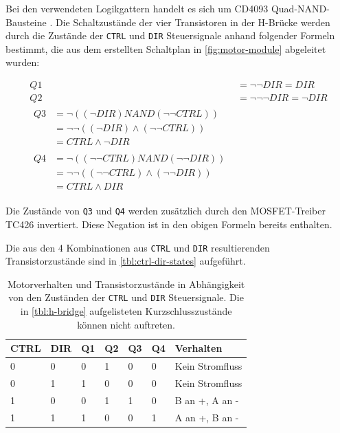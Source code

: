 \documentclass[german]{thesis_KBS}
\newcommand{\code}[1]{\texttt{#1}}  %
\begin{document}
Bei den verwendeten Logikgattern handelt es sich um CD4093 Quad-NAND-Bausteine
\cite{nand-datasheet}. Die Schaltzustände der vier Transistoren in der H-Brücke
werden durch die Zustände der \code{CTRL} und \code{DIR} Steuersignale anhand
folgender Formeln bestimmt, die aus dem erstellten Schaltplan in
\autoref{fig:motor-module} abgeleitet wurden:

\begin{align}
    Q1 &= \neg \neg \mathit{DIR} = \mathit{DIR} \\
    Q2 &= \neg \neg \neg \mathit{DIR} = \neg \mathit{DIR} \\
\begin{split}
    Q3 &= \neg ((\neg \mathit{DIR}) \mathit{NAND} (\neg \neg \mathit{CTRL})) \\
       &= \neg \neg ((\neg \mathit{DIR}) \wedge (\neg \neg \mathit{CTRL})) \\
       &= \mathit{CTRL} \wedge \neg \mathit{DIR}
\end{split} \\
\begin{split}
    Q4 &= \neg ((\neg \neg \mathit{CTRL}) \mathit{NAND} (\neg \neg \mathit{DIR})) \\
       &= \neg \neg ((\neg \neg \mathit{CTRL}) \wedge (\neg \neg \mathit{DIR})) \\
       &= \mathit{CTRL} \wedge \mathit{DIR}
\end{split}
\end{align}

Die Zustände von \code{Q3} und \code{Q4} werden zusätzlich durch den
MOSFET-Treiber TC426 invertiert. Diese Negation ist in den obigen Formeln
bereits enthalten.

Die aus den 4 Kombinationen aus \code{CTRL} und \code{DIR} resultierenden
Transistorzustände sind in \autoref{tbl:ctrl-dir-states} aufgeführt.

\begin{table}
    \centering
    \begin{tabular}{|l|l|l|l|l|l|l|}
        CTRL & DIR & Q1  & Q2  & Q3  & Q4  & Verhalten       \\ \hline
        0    & 0    & 0   & 1   & 0   & 0   & Kein Stromfluss \\
        0    & 1    & 1   & 0   & 0   & 0   & Kein Stromfluss \\
        1    & 0    & 0   & 1   & 1   & 0   & B an +, A an -  \\
        1    & 1    & 1   & 0   & 0   & 1   & A an +, B an -  \\
    \end{tabular}
    \caption{
        Motorverhalten und Transistorzustände in Abhängigkeit von den
        Zuständen der \code{CTRL} und \code{DIR} Steuersignale. Die in
        \autoref{tbl:h-bridge} aufgelisteten Kurzschlusszustände können nicht
        auftreten.
    }
    \label{tbl:ctrl-dir-states}
\end{table}
\end{document}
